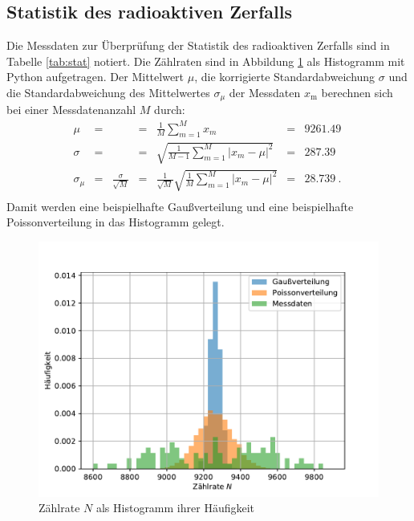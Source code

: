 \subsection{Statistik des radioaktiven Zerfalls}

Die Messdaten zur Überprüfung der Statistik des radioaktiven Zerfalls sind in Tabelle \ref{tab:stat} notiert.
Die Zählraten sind in Abbildung \ref{fig:stat} als Histogramm mit Python aufgetragen.
Der Mittelwert $\mu$, die korrigierte Standardabweichung $\sigma$ und die Standardabweichung des Mittelwertes $\sigma_{\mu}$ der Messdaten $x_{\text{m}}$ berechnen sich bei einer Messdatenanzahl $M$ durch:
\begin{align*}
  \mu           &=&                           &=& \frac{1}{M} \sum_{m=1}^{M} x_{m}                                   &=& \SI{9261.49}{} \\
  \sigma        &=&                           &=& \sqrt{\frac{1}{M-1} \sum_{m=1}^{M} |x_{m}-\mu|^2}                  &=& \SI{287.39}{}\\
  \sigma_{\mu}  &=&  \frac{\sigma}{\sqrt{M}}  &=& \frac{1}{\sqrt{M}} \sqrt{\frac{1}{M} \sum_{m=1}^{M} |x_{m}-\mu|^2} &=& \SI{28.739}{}.\\
\end{align*}
Damit werden eine beispielhafte Gaußverteilung und eine beispielhafte Poissonverteilung in das Histogramm gelegt.
\begin{figure}[h!]
  \centering
  \includegraphics[width=\textwidth]{stat.pdf}
  \caption{Zählrate $N$ als Histogramm ihrer Häufigkeit}
  \label{fig:stat}
\end{figure}

\FloatBarrier
